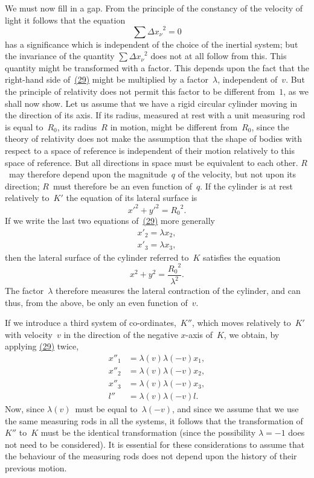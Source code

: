 \documentclass[12pt]{book}[2005/09/16]
\newcommand{\Change}[2]{#2}
\newcommand{\Add}[1]{\Change{}{#1}}
\newcommand{\PageSep}[1]{\ignorespaces}
\newcommand{\Eqref}[1]{\hyperref[eqn:#1]{#1}}
\begin{document}
We must now fill in a gap. From the principle of the
constancy of the velocity of light it follows that the
equation
\[
\sum {\Delta x_{\nu}}^{2} = 0
\]
\PageSep{38}
has a significance which is independent of the choice of
the inertial system; but the invariance of the quantity
$\sum {\Delta x_{\nu}}^{2}$ does not at all follow from this. This quantity
might be transformed with a factor. This depends upon
the fact that the right-hand side of~\Eqref{(29)} might be multiplied
by a factor~$\lambda$, independent of~$v$. But the principle
of relativity does not permit this factor to be different from~$1$,
as we shall now show. Let us assume that we have
a rigid circular cylinder moving in the direction of its
axis. If its radius, measured at rest with a unit measuring
rod is equal to~$R_{0}$, its radius~$R$ in motion, might be
different from~$R_{0}$, since the theory of relativity does not
make the assumption that the shape of bodies with respect
to a space of reference is independent of their motion
relatively to this space of reference. But all directions
in space must be equivalent to each other. $R$~may therefore
depend upon the magnitude~$q$ of the velocity, but
not upon its direction; $R$~must therefore be an even
function of~$q$. If the cylinder is at rest relatively to~$K'$
the equation of its lateral surface is
\[
x'^{2} + y'^{2} = {R_{0}}^{2}.
\]
If we write the last two equations of~\Eqref{(29)} more generally
\begin{align*}
{x'}_{2} = \lambda x_{2}\Add{,} \\
{x'}_{3} = \lambda x_{3}\Add{,}
\end{align*}
then the lateral surface of the cylinder referred to~$K$
satisfies the equation
\[
x^{2} + y^{2} = \frac{{R_{0}}^{2}}{\lambda^{2}}.
\]
\PageSep{39}
The factor~$\lambda$ therefore measures the lateral contraction of
the cylinder, and can thus, from the above, be only an
even function of~$v$.

If we introduce a third system of co-ordinates,~$K''$,
which moves relatively to~$K'$ with velocity~$v$ in the direction
of the negative $x$-axis of~$K$, we obtain, by applying
\Eqref{(29)} twice,
\begin{align*}
{x''}_{1} &= \lambda(v) \lambda(-v) x_{1}\Add{,} \\
{x''}_{2} &= \lambda(v) \lambda(-v) x_{2}\Add{,} \\
{x''}_{3} &= \lambda(v) \lambda(-v) x_{3}\Add{,} \\
l'' &= \lambda(v) \lambda(-v) l.
\end{align*}
Now, since $\lambda(v)$~must be equal to~$\lambda(-v)$, and since we
assume that we use the same measuring rods in all the
systems, it follows that the transformation of~$K''$ to~$K$
must be the identical transformation (since the possibility
$\lambda = -1$ does not need to be considered). It is essential
for these considerations to assume that the behaviour of
the measuring rods does not depend upon the history of
their previous motion.
\end{document}
